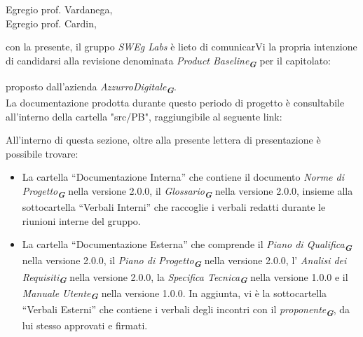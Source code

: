 
\fancyfoot[C]{\thepage} %



Egregio prof. Vardanega, \\
Egregio prof. Cardin, \\
\vspace{0.5cm}

con la presente, il gruppo \emph{SWEg Labs} è lieto di comunicarVi la propria intenzione di candidarsi alla revisione denominata
\emph{Product Baseline}\textsubscript{\textit{\textbf{G}}} per il capitolato:\\
\begin{center}
\end{center}
proposto dall’azienda \emph{AzzurroDigitale}\textsubscript{\textit{\textbf{G}}}.\\
La documentazione prodotta durante questo periodo di progetto è consultabile all’interno della cartella "src/PB",
raggiungibile al seguente link: 
\begin{center}
\end{center}
All’interno di questa sezione, oltre alla presente lettera di presentazione è possibile trovare:
\begin{itemize}
\item La cartella “Documentazione Interna” che contiene il documento \emph{Norme di Progetto}\textsubscript{\textit{\textbf{G}}} nella versione 2.0.0, il \emph{Glossario}\textsubscript{\textit{\textbf{G}}} nella versione 2.0.0, insieme alla sottocartella “Verbali Interni” che raccoglie i verbali redatti durante le riunioni interne del gruppo.
\item La cartella “Documentazione Esterna” che comprende il \emph{Piano di Qualifica}\textsubscript{\textit{\textbf{G}}} nella versione 2.0.0, il \emph{Piano di Progetto}\textsubscript{\textit{\textbf{G}}} nella versione 2.0.0, l' \emph{Analisi dei Requisiti}\textsubscript{\textit{\textbf{G}}} nella versione 2.0.0, la \emph{Specifica Tecnica}\textsubscript{\textit{\textbf{G}}} nella versione 1.0.0 e il \emph{Manuale Utente}\textsubscript{\textit{\textbf{G}}} nella versione 1.0.0. In aggiunta, vi è la sottocartella “Verbali Esterni” che contiene i verbali degli incontri con il \emph{proponente}\textsubscript{\textit{\textbf{G}}}, da lui stesso approvati e firmati.
\end{itemize}
